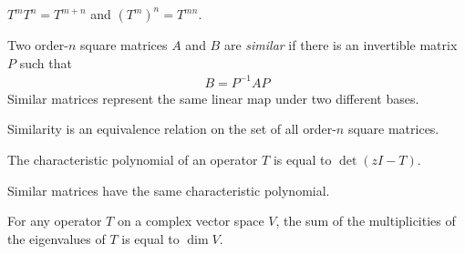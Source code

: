 \documentclass{article}
\begin{document}
\begin{remark}
  $T^m T^n = T^{m + n}$ and $(T^m)^n = T^{mn}$.
\end{remark}

\begin{definition}
  Two order-$n$ square matrices $A$ and $B$ are \emph{similar} if there is an invertible matrix $P$ such that
  \begin{align}
    B = P^{-1}AP
  \end{align}
  Similar matrices represent the same linear map under two different bases.
\end{definition}

\begin{remark}
  Similarity is an equivalence relation on the set of all order-$n$ square matrices.
\end{remark}

\begin{definition}
  The characteristic polynomial of an operator $T$ is equal to $\det (zI - T)$.
\end{definition}

\begin{remark}
  Similar matrices have the same characteristic polynomial.
\end{remark}

\begin{theorem}
  For any operator $T$ on a complex vector space $V$, the sum of the multiplicities of the eigenvalues of $T$ is equal to $\dim V$.
\end{theorem}
\end{document}
